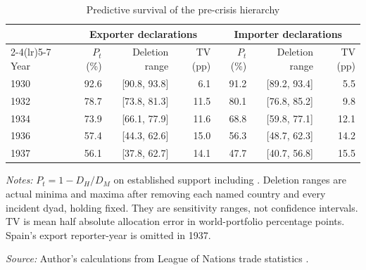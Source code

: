 \begin{table}[!htbp]\centering
\caption{Predictive survival of the pre-crisis hierarchy}\label{tab:established}
\begin{threeparttable}\small\setlength{\tabcolsep}{4pt}
\begin{tabular}{@{}lrrrrrr@{}}
\toprule
& \multicolumn{3}{c}{Exporter declarations} & \multicolumn{3}{c}{Importer declarations}\\\cmidrule(lr){2-4}\cmidrule(lr){5-7}
Year & $P_t$ (\%) & Deletion range & TV (pp) & $P_t$ (\%) & Deletion range & TV (pp) \\
\midrule
1930 & 92.6 & [90.8, 93.8] & 6.1 & 91.2 & [89.2, 93.4] & 5.5 \\
1932 & 78.7 & [73.8, 81.3] & 11.5 & 80.1 & [76.8, 85.2] & 9.8 \\
1934 & 73.9 & [66.1, 77.9] & 11.6 & 68.8 & [59.8, 77.1] & 12.1 \\
1936 & 57.4 & [44.3, 62.6] & 15.0 & 56.3 & [48.7, 62.3] & 14.2 \\
1937 & 56.1 & [37.8, 62.7] & 14.1 & 47.7 & [40.7, 56.8] & 15.5 \\
\bottomrule
\end{tabular}
\begin{tablenotes}[flushleft]\footnotesize\item \textit{Notes:} $P_t=1-D_H/D_M$ on established support including \External{}. Deletion ranges are actual minima and maxima after removing each named country and every incident dyad, holding \External{} fixed. They are sensitivity ranges, not confidence intervals. TV is mean half absolute allocation error in world-portfolio percentage points. Spain's export reporter-year is omitted in 1937.
\item \textit{Source:} Author's calculations from League of Nations trade statistics \parencite{league1930,league1936,league1938}.
\end{tablenotes}\end{threeparttable}\end{table}
